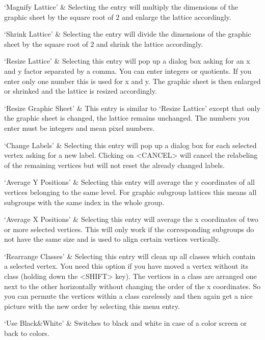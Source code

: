 `Magnify Lattice' & 
  Selecting the entry will multiply the dimensions of the graphic sheet by
  the square root of $2$ and enlarge the lattice accordingly.

`Shrink Lattice' &
  Selecting  the entry will divide the  dimensions  of the graphic sheet by 
  the square root of $2$ and shrink the lattice accordingly.

`Resize Lattice' &
Selecting this entry will pop up a dialog box asking for an x and y factor
separated by a comma.  You can enter integers or quotients. If you enter
only one number this is used for x and y.  The graphic sheet is then
enlarged or shrinked and the lattice is resized accordingly.

`Resize Graphic Sheet' &
This  entry is similar to `Resize  Lattice' except that  only the graphic
sheet is changed, the lattice remains unchanged. The numbers you enter must 
be integers and mean pixel numbers.

`Change Labels' &
Selecting  this entry will pop  up a dialog  box for each selected vertex
asking for a new label.  Clicking on <CANCEL>  will cancel the relabeling
of the remaining vertices but will not reset the already changed labels.

`Average Y Positions' &
Selecting this entry will average the y coordinates of all vertices
belonging to the same level. For graphic subgroup lattices this means all
subgroups with the same index in the whole group.

`Average X Positions' &
Selecting this entry  will  average the x   coordinates  of two or   more
selected vertices.  This will only work if the corresponding subgroups do
not have the same size and is used to align certain vertices
vertically.

`Rearrange Classes' \label{Rearrange Classes} &
Selecting this entry will clean up all classes which contain a selected
vertex. You need this option if you have moved a vertex without its class
(holding down the <SHIFT> key). The vertices in a class are arranged one
next to the other horizontally without changing the order of the x
coordinates. So you can permute the vertices within a class carelessly and
then again get a nice picture with the new order by selecting this menu
entry.

`Use Black\&White' &
Switches to black and white in case of a color screen or back to colors.
\enditems


